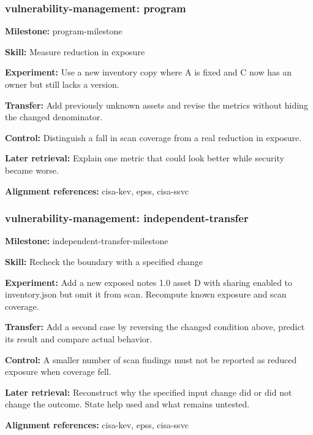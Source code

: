 \subsubsection{vulnerability-management: program}
\noindent\textbf{Milestone:} program-milestone\par
\noindent\textbf{Skill:} Measure reduction in exposure\par
\noindent\textbf{Experiment:} Use a new inventory copy where A is fixed and C now has an owner but still lacks a version.\par
\noindent\textbf{Transfer:} Add previously unknown assets and revise the metrics without hiding the changed denominator.\par
\noindent\textbf{Control:} Distinguish a fall in scan coverage from a real reduction in exposure.\par
\noindent\textbf{Later retrieval:} Explain one metric that could look better while security became worse.\par
\noindent\textbf{Alignment references:} cisa-kev, epss, cisa-ssvc\par
\subsubsection{vulnerability-management: independent-transfer}
\noindent\textbf{Milestone:} independent-transfer-milestone\par
\noindent\textbf{Skill:} Recheck the boundary with a specified change\par
\noindent\textbf{Experiment:} Add a new exposed notes 1.0 asset D with sharing enabled to inventory.json but omit it from scan. Recompute known exposure and scan coverage.\par
\noindent\textbf{Transfer:} Add a second case by reversing the changed condition above, predict its result and compare actual behavior.\par
\noindent\textbf{Control:} A smaller number of scan findings must not be reported as reduced exposure when coverage fell.\par
\noindent\textbf{Later retrieval:} Reconstruct why the specified input change did or did not change the outcome. State help used and what remains untested.\par
\noindent\textbf{Alignment references:} cisa-kev, epss, cisa-ssvc\par
